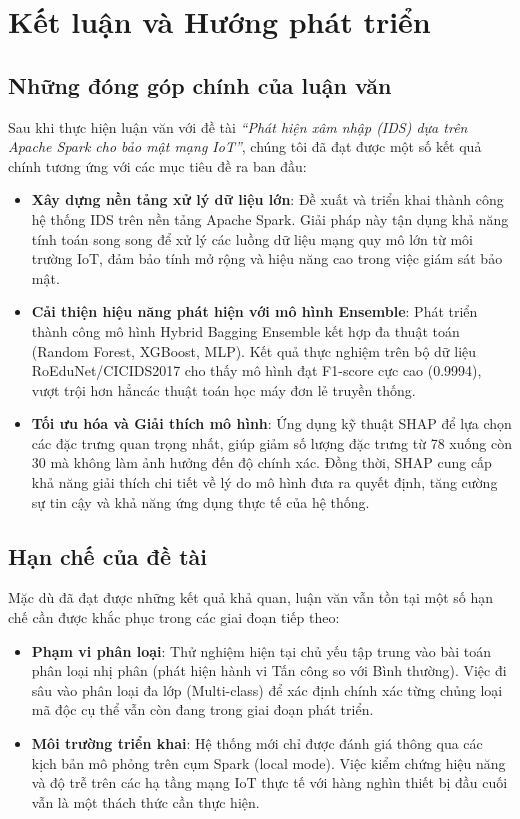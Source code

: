\chapter{Kết luận và Hướng phát triển}

\section{Những đóng góp chính của luận văn}
Sau khi thực hiện luận văn với đề tài \textit{``Phát hiện xâm nhập (IDS) dựa trên Apache Spark cho bảo mật mạng IoT''}, chúng tôi đã đạt được một số kết quả chính tương ứng với các mục tiêu đề ra ban đầu:
\begin{itemize}
    \item \textbf{Xây dựng nền tảng xử lý dữ liệu lớn}: Đề xuất và triển khai thành công hệ thống IDS trên nền tảng Apache Spark. Giải pháp này tận dụng khả năng tính toán song song để xử lý các luồng dữ liệu mạng quy mô lớn từ môi trường IoT, đảm bảo tính mở rộng và hiệu năng cao trong việc giám sát bảo mật.
    \item \textbf{Cải thiện hiệu năng phát hiện với mô hình Ensemble}: Phát triển thành công mô hình Hybrid Bagging Ensemble kết hợp đa thuật toán (Random Forest, XGBoost, MLP). Kết quả thực nghiệm trên bộ dữ liệu RoEduNet/CICIDS2017 cho thấy mô hình đạt F1-score cực cao (0.9994), vượt trội hơn hẳncác thuật toán học máy đơn lẻ truyền thống.
    \item \textbf{Tối ưu hóa và Giải thích mô hình}: Ứng dụng kỹ thuật SHAP để lựa chọn các đặc trưng quan trọng nhất, giúp giảm số lượng đặc trưng từ 78 xuống còn 30 mà không làm ảnh hưởng đến độ chính xác. Đồng thời, SHAP cung cấp khả năng giải thích chi tiết về lý do mô hình đưa ra quyết định, tăng cường sự tin cậy và khả năng ứng dụng thực tế của hệ thống.
\end{itemize}

\section{Hạn chế của đề tài}
Mặc dù đã đạt được những kết quả khả quan, luận văn vẫn tồn tại một số hạn chế cần được khắc phục trong các giai đoạn tiếp theo:
\begin{itemize}
    \item \textbf{Phạm vi phân loại}: Thử nghiệm hiện tại chủ yếu tập trung vào bài toán phân loại nhị phân (phát hiện hành vi Tấn công so với Bình thường). Việc đi sâu vào phân loại đa lớp (Multi-class) để xác định chính xác từng chủng loại mã độc cụ thể vẫn còn đang trong giai đoạn phát triển.
    \item \textbf{Môi trường triển khai}: Hệ thống mới chỉ được đánh giá thông qua các kịch bản mô phỏng trên cụm Spark (local mode). Việc kiểm chứng hiệu năng và độ trễ trên các hạ tầng mạng IoT thực tế với hàng nghìn thiết bị đầu cuối vẫn là một thách thức cần thực hiện.
\end{itemize}

